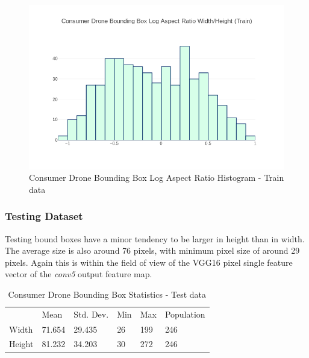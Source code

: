 \documentclass{article}
\begin{document}
\begin{figure}[h]
\centering
\label{consumerdronetrainaspect}
\includegraphics[scale=0.4]{images/train-aspect.png}
\caption{Consumer Drone Bounding Box Log Aspect Ratio Histogram - Train data}
\end{figure}

\subsubsection{Testing Dataset}

Testing bound boxes have a minor tendency to be larger in height than in width. The average size is also around 76 pixels, with minimum pixel size of around 29 pixels. Again this is within the field of view of the VGG16 pixel single feature vector of the \textit{conv5} output feature map. 

\begin{table}[ht]
\caption{Consumer Drone Bounding Box Statistics - Test data}
\centering
\begin{tabular}{llllll}
       & Mean   & Std. Dev. & Min & Max & Population\\
Width  & 71.654 & 29.435 & 26 & 199 & 246 \\
Height & 81.232 & 34.203 & 30 & 272 & 246
\end{tabular}
\end{table}
\end{document}
